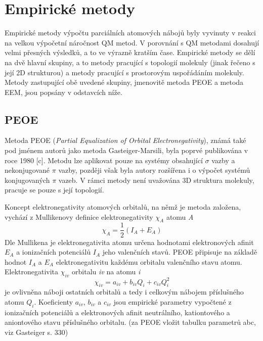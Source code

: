 \section{Empirické metody}
Empirické metody výpočtu parciálních atomových nábojů byly vyvinuty v reakci na velkou výpočetní náročnost QM metod. V porovnání s QM metodami dosahují velmi přesných výsledků, a to ve výrazně kratším čase. Empirické metody se dělí na dvě hlavní skupiny, a to metody pracující s topologií molekuly (jinak řečeno s její 2D strukturou) a metody pracující s prostorovým uspořádáním molekuly. Metody zastupující obě uvedené skupiny, jmenovitě metoda PEOE a metoda EEM, jsou popsány v odstavcích níže.
\subsection{PEOE}
Metoda PEOE (\textit{Partial Equalization of Orbital Electronegativity}), známá také pod jménem autorů jako metoda Gasteiger-Marsili, byla poprvé publikována v roce 1980 [c]. Metodu lze aplikovat pouze na systémy obsahující $\sigma$ vazby a nekonjugované $\pi$  vazby, později však byla autory rozšířena i o výpočet systémů konjugovaných $\pi$ vazeb. V rámci metody není uvažována 3D struktura molekuly, pracuje se pouze s její topologií. 

Koncept elektronegativity atomových orbitalů, na němž je metoda založena, vychází z Mullikenovy definice elektronegativity $\chi_A$ atomu \textit{A}
\begin{equation}
    \chi_A = \frac{1}{2}(I_A + E_A)
\end{equation}
Dle Mullikena je elektronegativita atomu určena hodnotami elektronových afinit $ E_A$ a ionizačních potenciálů $I_A$ jeho valenčních stavů. PEOE připisuje na základě hodnot $I_A$ a $ E_A$ elektronegativitu každému orbitalu valenčního stavu atomu. Elektronegativita $\chi_{iv}$ orbitalu \textit{iv} na atomu \textit{i}
\begin{equation}
\label{PEOE_elneg}
    \chi_{iv} = a_{iv} + b_{iv}Q_i + c_{iv}Q_i^2
\end{equation}
je ovlivněna náboji ostatních orbitalů a tedy i celkovým nábojem příslušného atomu $Q_i$. Koeficienty $a_{iv}$, $b_{iv}$ a $c_{iv}$ jsou empirické parametry vypočtené z ionizačních potenciálů a elektronových afinit neutrálního, kationtového a aniontového stavu příslušného orbitalu. (za PEOE vložit tabulku parametrů abc, viz Gasteiger s. 330)

